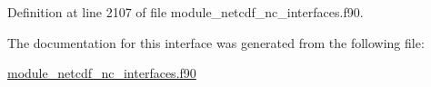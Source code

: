 Definition at line 2107 of file module\+\_\+netcdf\+\_\+nc\+\_\+interfaces.\+f90.



The documentation for this interface was generated from the following file\+:\begin{DoxyCompactItemize}
\item 
\hyperlink{module__netcdf__nc__interfaces_8f90}{module\+\_\+netcdf\+\_\+nc\+\_\+interfaces.\+f90}\end{DoxyCompactItemize}
